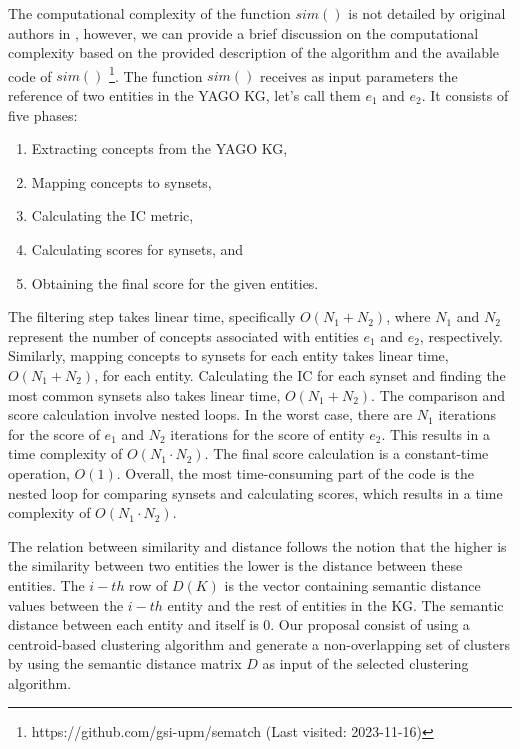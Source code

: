 \documentclass{ieeeaccess}
\begin{document}
The computational complexity of the function $sim()$
is not detailed by original authors in \cite{ZHU201730}, 
however, we can provide a brief discussion on the 
computational complexity based on the provided 
description of the algorithm and the available
code of $sim()$ 
\footnote{https://github.com/gsi-upm/sematch (Last visited: 2023-11-16)}.
The function $sim()$ receives as input parameters
the reference of two entities in the YAGO KG, let's
call them $e_{1}$ and $e_{2}$. It consists of 
five phases:

\begin{enumerate}
    \item Extracting concepts from the YAGO KG,
    \item Mapping concepts to synsets,
    \item Calculating the IC metric,
    \item Calculating scores for synsets, and
    \item Obtaining the final score for the given entities.
\end{enumerate}

The filtering step takes linear time, specifically 
$O(N_{1} + N_{2})$, where $N_{1}$ and $N_{2}$ 
represent the number of concepts associated with 
entities $e_{1}$ and $e_{2}$, respectively. Similarly,
mapping concepts to synsets for each entity takes linear
time, $O(N_{1} + N_{2})$, for each entity. Calculating 
the IC for each synset and finding the most common 
synsets also takes linear time, $O(N_{1} + N_{2})$. 
The comparison and score calculation involve nested
loops. In the worst case, there are $N_{1}$ iterations
for the score of $e_{1}$ and $N_{2}$ iterations for
the score of entity $e_{2}$. This results in a time
complexity of $O(N_{1} \cdot N_{2})$. The final score
calculation is a constant-time operation, $O(1)$. 
Overall, the most time-consuming part of the code is 
the nested loop for comparing synsets and calculating
scores, which results in a time complexity of 
$O(N_{1} \cdot N_{2})$.


The relation between similarity and distance follows 
the notion that the higher is the similarity between 
two entities the lower is the distance between these 
entities. The $i-th$ row of $D(K)$ is the vector 
containing semantic distance values between the $i-th$
entity and the rest of entities in the KG. The semantic
distance between each entity and itself is $0$. Our 
proposal consist of using a centroid-based clustering 
algorithm and generate a non-overlapping
set of clusters by using the semantic distance matrix
$D$ as input of the selected clustering algorithm. 
\end{document}
